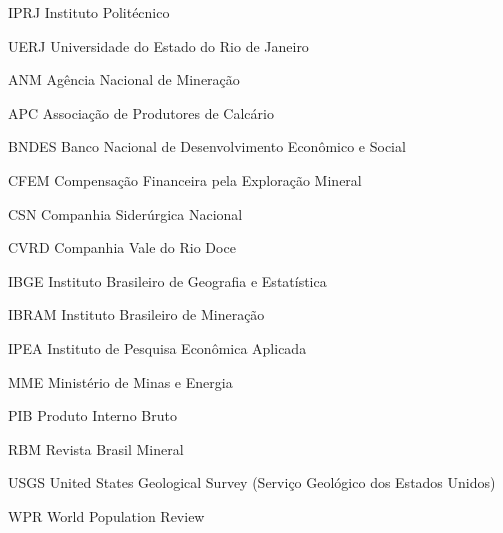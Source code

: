 \begin{siglas}
\item[IPRJ] Instituto Politécnico
\item[UERJ] Universidade do Estado do Rio de Janeiro

\item[ANM] Agência Nacional de Mineração
\item[APC] Associação de Produtores de Calcário
\item[BNDES] Banco Nacional de Desenvolvimento Econômico e Social
\item[CFEM] Compensação Financeira pela Exploração Mineral
\item[CSN] Companhia Siderúrgica Nacional
\item[CVRD] Companhia Vale do Rio Doce
\item[IBGE] Instituto Brasileiro de Geografia e Estatística
\item[IBRAM] Instituto Brasileiro de Mineração
\item[IPEA] Instituto de Pesquisa Econômica Aplicada
\item[MME] Ministério de Minas e Energia
\item[PIB] Produto Interno Bruto
\item[RBM] Revista Brasil Mineral
\item[USGS] United States Geological Survey (Serviço Geológico dos Estados Unidos)
\item[WPR] World Population Review
\end{siglas}